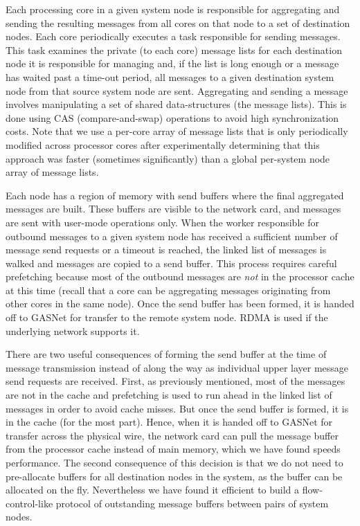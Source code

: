 Each processing core in a given system node is responsible for
aggregating and sending the resulting messages from all cores on
that node to a set of destination nodes.  Each core periodically
executes a task responsible for sending messages.  This task examines
the private (to each core) message lists for each destination node it
is responsible for managing and, if the list is long enough or a
message has waited past a time-out period, all messages to a given
destination system node from that source system node are sent.
Aggregating and sending a message involves manipulating a set of
shared data-structures (the message lists). This is done using CAS
(compare-and-swap) operations to avoid high synchronization costs.
Note that we use a per-core array of message lists
that is only periodically modified across processor cores after
experimentally determining that this approach was faster (sometimes
significantly) than a global per-system node array of message lists.

Each node has a region of memory with send buffers where the final aggregated
messages are built. These buffers are visible to the network card, and
messages are sent with user-mode operations only. When the worker
responsible for outbound messages to a given system node has received a
sufficient number of message send requests or a timeout is reached, the
linked list of messages is walked and messages are copied to a send buffer.
This process requires careful prefetching because most of the outbound
messages are \emph{not\/} in the processor cache at this time (recall that a
core can be aggregating messages originating from other cores in the same
node). Once the send buffer has been formed, it is handed off to GASNet for
transfer to the remote system node. RDMA is used if the underlying network
supports it. 

There are two useful consequences of forming the send buffer at the time of
message transmission instead of along the way as individual upper layer
message send requests are received. First, as previously mentioned, most of the
messages are not in the cache and prefetching is used to run ahead in the
linked list of messages in order to avoid cache misses. But once the send
buffer is formed, it is in the cache (for the most part). Hence, when it is
handed off to GASNet for transfer across the physical wire, the network card
can pull the message buffer from the processor cache instead of main memory,
which we have found speeds performance. The second consequence of this
decision is that we do not need to pre-allocate buffers for all destination
nodes in the system, as the buffer can be allocated on the fly. Nevertheless
we have found it efficient to build a flow-control-like protocol of
outstanding message buffers between pairs of system nodes.

